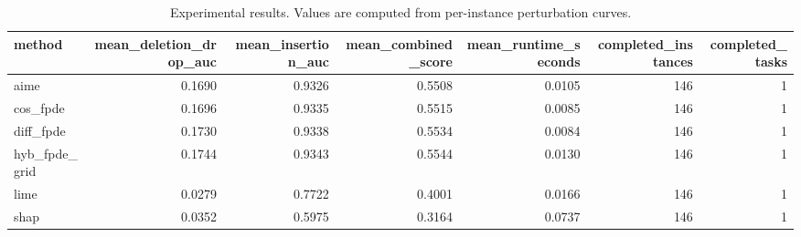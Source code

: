\begin{table}[t]
\caption{Experimental results. Values are computed from per-instance perturbation curves.}
\label{tab:main_results_computed}
\centering
\begin{tabular}{lrrrrrr}
\toprule
method & mean\_deletion\_drop\_auc & mean\_insertion\_auc & mean\_combined\_score & mean\_runtime\_seconds & completed\_instances & completed\_tasks \\
\midrule
aime & 0.1690 & 0.9326 & 0.5508 & 0.0105 & 146 & 1 \\
cos\_fpde & 0.1696 & 0.9335 & 0.5515 & 0.0085 & 146 & 1 \\
diff\_fpde & 0.1730 & 0.9338 & 0.5534 & 0.0084 & 146 & 1 \\
hyb\_fpde\_grid & 0.1744 & 0.9343 & 0.5544 & 0.0130 & 146 & 1 \\
lime & 0.0279 & 0.7722 & 0.4001 & 0.0166 & 146 & 1 \\
shap & 0.0352 & 0.5975 & 0.3164 & 0.0737 & 146 & 1 \\
\bottomrule
\end{tabular}

\end{table}
